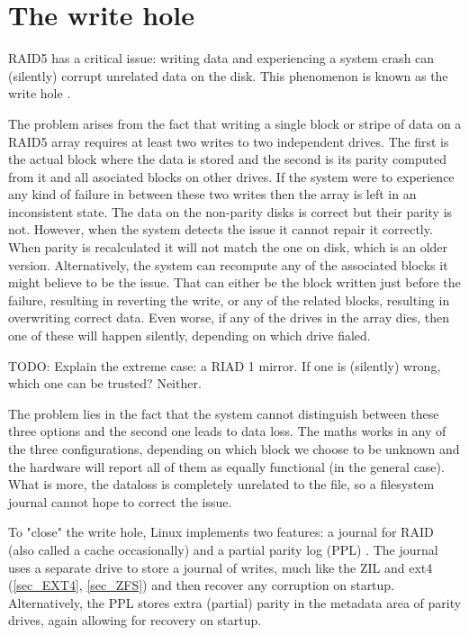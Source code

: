     \section{The write hole}

        RAID5 has a critical issue: writing data and experiencing a system
        crash can (silently) corrupt unrelated data on the disk. This
        phenomenon is known as the write hole \cite{LWN_md_journal}.

        The problem arises from the fact that writing a single block or stripe
        of data on a RAID5 array requires at least two writes to two
        independent drives. The first is the actual block where the data is
        stored and the second is its parity computed from it and all asociated
        blocks on other drives. If the system were to experience any kind of
        failure in between these two writes then the array is left in an
        inconsistent state. The data on the non-parity disks is correct but
        their parity is not. However, when the system detects the issue it
        cannot repair it correctly. When parity is recalculated it will not
        match the one on disk, which is an older version. Alternatively, the
        system can recompute any of the associated blocks it might believe to
        be the issue. That can either be the block written just before the
        failure, resulting in reverting the write, or any of the related
        blocks, resulting in overwriting correct data. Even worse, if any of
        the drives in the array dies, then one of these will happen silently,
        depending on which drive fialed.

        TODO:
        Explain the extreme case: a RIAD 1 mirror. If one is (silently) wrong,
        which one can be trusted? Neither.

        The problem lies in the fact that the system cannot distinguish between
        these three options and the second one leads to data loss. The maths
        works in any of the three configurations, depending on which block we
        choose to be unknown and the hardware will report all of them as
        equally functional (in the general case). What is more, the dataloss is
        completely unrelated to the file, so a filesystem journal cannot hope
        to correct the issue.

        To "close" the write hole, Linux implements two features: a journal for
        RAID \cite{LWN_md_journal} (also called a cache occasionally) and a
        partial parity log (PPL) \cite{PPL:
        https://www.kernel.org/doc/html/latest/driver-api/md/raid5-ppl.html}.
        The journal uses a separate drive to store a journal of writes, much
        like the ZIL and ext4 (\ref{sec_EXT4}, \ref{sec_ZFS}) and then recover
        any corruption on startup. Alternatively, the PPL stores extra
        (partial) parity in the metadata area of parity drives, again allowing
        for recovery on startup.

